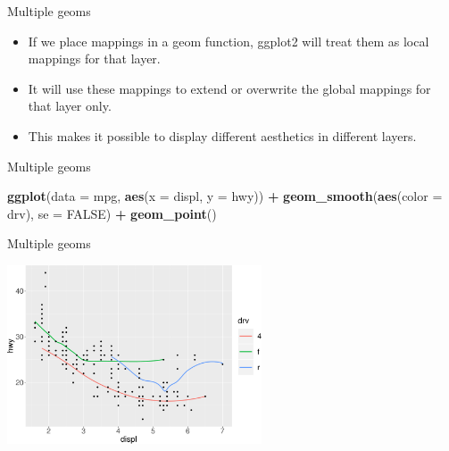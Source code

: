 \documentclass[ignorenonframetext,]{beamer}
\newenvironment{Shaded}{\begin{snugshade}}{\end{snugshade}}
\newcommand{\DataTypeTok}[1]{\textcolor[rgb]{0.13,0.29,0.53}{#1}}
\newcommand{\KeywordTok}[1]{\textcolor[rgb]{0.13,0.29,0.53}{\textbf{#1}}}
\newcommand{\NormalTok}[1]{#1}
\newcommand{\OperatorTok}[1]{\textcolor[rgb]{0.81,0.36,0.00}{\textbf{#1}}}
\newcommand{\OtherTok}[1]{\textcolor[rgb]{0.56,0.35,0.01}{#1}}
\newcommand{\StringTok}[1]{\textcolor[rgb]{0.31,0.60,0.02}{#1}}
\begin{document}
\begin{frame}{Multiple geoms}
\protect\hypertarget{multiple-geoms-7}{}

\begin{itemize}
\item
  If we place mappings in a geom function, ggplot2 will treat them as
  local mappings for that layer.
\item
  It will use these mappings to extend or overwrite the global mappings
  for that layer only.
\item
  This makes it possible to display different aesthetics in different
  layers.
\end{itemize}

\end{frame}

\begin{frame}[fragile]{Multiple geoms}
\protect\hypertarget{multiple-geoms-8}{}

\begin{Shaded}
\begin{Highlighting}[]
\KeywordTok{ggplot}\NormalTok{(}\DataTypeTok{data =}\NormalTok{ mpg, }\KeywordTok{aes}\NormalTok{(}\DataTypeTok{x =}\NormalTok{ displ, }\DataTypeTok{y =}\NormalTok{ hwy)) }\OperatorTok{+}\StringTok{ }
\StringTok{  }\KeywordTok{geom_smooth}\NormalTok{(}\KeywordTok{aes}\NormalTok{(}\DataTypeTok{color =}\NormalTok{ drv), }\DataTypeTok{se =} \OtherTok{FALSE}\NormalTok{) }\OperatorTok{+}
\StringTok{  }\KeywordTok{geom_point}\NormalTok{()}
\end{Highlighting}
\end{Shaded}

\end{frame}

\begin{frame}{Multiple geoms}
\protect\hypertarget{multiple-geoms-9}{}

\begin{center}\includegraphics[height=200px]{data-visualization_files/figure-beamer/unnamed-chunk-87-1} \end{center}

\end{frame}
\end{document}
